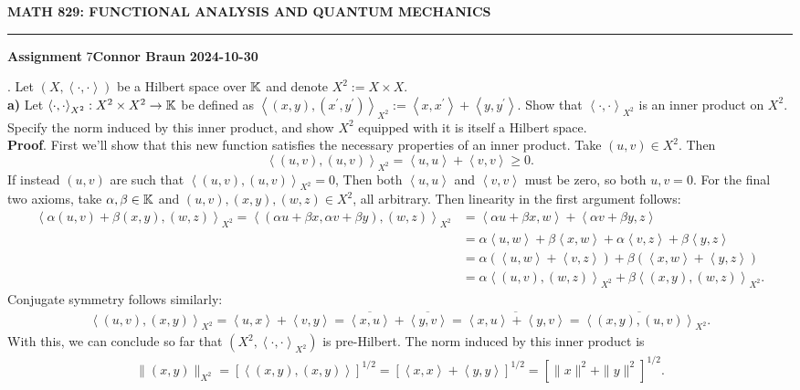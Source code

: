 \documentclass[10pt]{article}
\newcommand{\1}[1]{\mathbbm{1}_{#1}} \newcommand{\mc}[1]{\mathcal{#1}}
\newcommand{\ip}[2]{\left\langle#1,#2\right\rangle }
\begin{document}
    \begin{center}
        {\bf\large{MATH 829: FUNCTIONAL ANALYSIS AND QUANTUM MECHANICS}}
        \smallskip
        \hrule
        \smallskip
        {\bf Assignment} 7\hfill {\bf Connor Braun} \hfill {\bf 2024-10-30}
    \end{center}
    . Let $(X,\ip{\cdot}{\cdot})$ be a Hilbert space over
    $\mathbb{K}$ and denote $X^2:=X\times X$.\\[5pt]
    {\bf a)} Let $\ip{\cdot}{\cdot}_{X^2}:X^2\times X^2\rightarrow\mbb{K}$ be
    defined as
    $\ip{(x,y)}{(x^\prime,y^\prime)}_{X^2}:=\ip{x}{x^\prime}+\ip{y}{y^\prime}$.
    Show that $\ip{\cdot}{\cdot}_{X^2}$ is an inner product on $X^2$. Specify
    the norm induced by this inner product, and show $X^2$ equipped with it is
    itself a Hilbert space.\\[5pt]
    {\bf Proof}. First we'll show that this new function satisfies the necessary
    properties of an inner product. Take $(u,v)\in X^2$. Then
    \[\ip{(u,v)}{(u,v)}_{X^2}=\ip{u}{u}+\ip{v}{v}\geq0.\] If instead $(u,v)$ are
    such that $\ip{(u,v)}{(u,v)}_{X^2}=0$, Then both $\ip{u}{u}$ and $\ip{v}{v}$
    must be zero, so both $u,v=0$. For the final two axioms, take
    $\alpha,\beta\in\mathbb{K}$ and $(u,v),(x,y),(w,z)\in X^2$, all arbitrary. Then
    linearity in the first argument follows:
    \begin{align*}
        \ip{\alpha(u,v)+\beta(x,y)}{(w,z)}_{X^2}=\ip{(\alpha u+\beta x, \alpha v+\beta y)}{(w,z)}_{X^2}&=\ip{\alpha u+\beta x}{w}+\ip{\alpha v+\beta y}{z}\\
        &=\alpha\ip{u}{w}+\beta\ip{x}{w}+\alpha\ip{v}{z}+\beta\ip{y}{z}\\
        &=\alpha(\ip{u}{w}+\ip{v}{z})+\beta(\ip{x}{w}+\ip{y}{z})\\
        &=\alpha\ip{(u,v)}{(w,z)}_{X^2}+\beta\ip{(x,y)}{(w,z)}_{X^2}.
    \end{align*}
    Conjugate symmetry follows similarly:
    \begin{align*}
        \ip{(u,v)}{(x,y)}_{X^2}=\ip{u}{x}+\ip{v}{y}=\overline{\ip{x}{u}}+\overline{\ip{y}{v}}=\overline{\ip{x}{u}+\ip{y}{v}}=\overline{\ip{(x,y)}{(u,v)}}_{X^2}.
    \end{align*}
    With this, we can conclude so far that $(X^2,\ip{\cdot}{\cdot}_{X^2})$ is
    pre-Hilbert. The norm induced by this inner product is
    \begin{align*}
        \|(x,y)\|_{X^2}=\left[\ip{(x,y)}{(x,y)}\right]^{1/2}=\left[\ip{x}{x}+\ip{y}{y}\right]^{1/2}=\left[\|x\|^2+\|y\|^2\right]^{1/2}.
    \end{align*}
\end{document}
